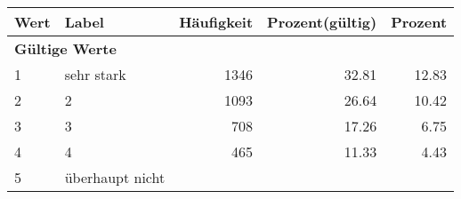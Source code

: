      \begin{longtable}{lXrrr}
     \toprule
     \textbf{Wert} & \textbf{Label} & \textbf{Häufigkeit} & \textbf{Prozent(gültig)} & \textbf{Prozent} \\
     \endhead
     \midrule
     \multicolumn{5}{l}{\textbf{Gültige Werte}}\\

     1 &
     \multicolumn{1}{X}{ sehr stark   } &


       \num{1346} &
       \num[round-mode=places,round-precision=2]{32,81} &
         \num[round-mode=places,round-precision=2]{12,83} \\

     2 &
     \multicolumn{1}{X}{ 2   } &


       \num{1093} &
       \num[round-mode=places,round-precision=2]{26,64} &
         \num[round-mode=places,round-precision=2]{10,42} \\

     3 &
     \multicolumn{1}{X}{ 3   } &


       \num{708} &
       \num[round-mode=places,round-precision=2]{17,26} &
         \num[round-mode=places,round-precision=2]{6,75} \\

     4 &
     \multicolumn{1}{X}{ 4   } &


       \num{465} &
       \num[round-mode=places,round-precision=2]{11,33} &
         \num[round-mode=places,round-precision=2]{4,43} \\

     5 &
     \multicolumn{1}{X}{ überhaupt nicht   } &



\end{longtable}

